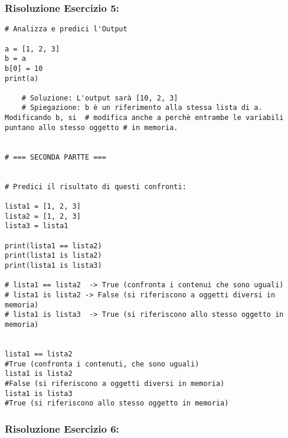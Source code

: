 \subsubsection{Risoluzione Esercizio 5: }

\begin{lstlisting}
# Analizza e predici l'Output

a = [1, 2, 3]
b = a
b[0] = 10
print(a)

    # Soluzione: L'output sarà [10, 2, 3] 
    # Spiegazione: b è un riferimento alla stessa lista di a. Modificando b, si  # modifica anche a perchè entrambe le variabili puntano allo stesso oggetto # in memoria.


# === SECONDA PARTTE ===


# Predici il risultato di questi confronti:

lista1 = [1, 2, 3]
lista2 = [1, 2, 3]
lista3 = lista1

print(lista1 == lista2)
print(lista1 is lista2)
print(lista1 is lista3)

# lista1 == lista2  -> True (confronta i contenui che sono uguali)
# lista1 is lista2 -> False (si riferiscono a oggetti diversi in memoria)
# lista1 is lista3  -> True (si riferiscono allo stesso oggetto in memoria)


lista1 == lista2 
#True (confronta i contenuti, che sono uguali)
lista1 is lista2 
#False (si riferiscono a oggetti diversi in memoria)
lista1 is lista3 
#True (si riferiscono allo stesso oggetto in memoria)
\end{lstlisting}


\subsubsection{Risoluzione Esercizio 6: }

